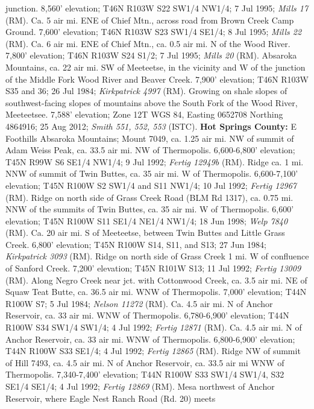 junction. 8,560’ elevation; T46N R103W S22 SW1/4 NW1/4; 7 Jul 1995;
\textit{Mills 17} (RM).
Ca. 5 air mi. ENE of Chief Mtn., across road from Brown Creek Camp Ground.
7,600’ elevation; T46N R103W S23 SW1/4 SE1/4; 8 Jul 1995;
\textit{Mills 22} (RM).
Ca. 6 air mi. ENE of Chief Mtn., ca. 0.5 air mi. N of the Wood River. 7,800’
elevation; T46N R103W S24 S1/2; 7 Jul 1995; \textit{Mills 20} (RM).
Absaroka Mountains, ca. 22 air mi. SW of Meeteetse, in the vicinity and W of the
junction of the Middle Fork Wood River and Beaver Creek. 7,900’ elevation;
T46N R103W S35 and 36; 26 Jul 1984; \textit{Kirkpatrick 4997} (RM).
Growing on shale slopes of southwest-facing slopes of mountains above the South
Fork of the Wood River, Meeteetsee. 7,588’ elevation; Zone 12T WGS 84,
Easting 0652708 Northing 4864916; 25 Aug 2012;
\textit{Smith 551, 552, 553} (ISTC).
  \textbf{Hot Springs County:}
E Foothills Absaroka Mountains; Mount 7049, ca. 1.25 air mi. NW of summit of
Adam Weiss Peak, ca. 33.5 air mi. NW of Thermopolis. 6,600-6,800' elevation;
T45N R99W S6 SE1/4 NW1/4; 9 Jul 1992; \textit{Fertig 12949b} (RM).
Ridge ca. 1 mi. NNW of summit of Twin Buttes, ca. 35 air mi. W of Thermopolis.
6,600-7,100' elevation; T45N R100W S2 SW1/4 and S11 NW1/4; 10 Jul 1992;
\textit{Fertig 12967} (RM).
Ridge on north side of Grass Creek Road (BLM Rd 1317), ca. 0.75 mi. NNW of the
summits of Twin Buttes, ca. 35 air mi. W of Thermopolis. 6,600' elevation;
T45N R100W S11 SE1/4 NE1/4 NW1/4; 18 Jun 1998; \textit{Welp 7840} (RM).
Ca. 20 air mi. S of Meeteetse, between Twin Buttes and Little Grass Creek.
6,800' elevation; T45N R100W S14, S11, and S13; 27 Jun 1984;
\textit{Kirkpatrick 3093} (RM).
Ridge on north side of Grass Creek 1 mi. W of confluence of Sanford Creek.
7,200' elevation; T45N R101W S13; 11 Jul 1992; \textit{Fertig 13009} (RM).
Along Negro Creek near jct. with Cottonwood Creek, ca. 3.5 air mi. NE of Squaw
Teat Butte, ca. 36.5 air mi. WNW of Thermopolis. 7,000' elevation;
T44N R100W S7; 5 Jul 1984; \textit{Nelson 11272} (RM).
Ca. 4.5 air mi. N of Anchor Reservoir, ca. 33 air mi. WNW of Thermopolis.
6,780-6,900' elevation; T44N R100W S34 SW1/4 SW1/4; 4 Jul 1992;
\textit{Fertig 12871} (RM).
Ca. 4.5 air mi. N of Anchor Reservoir, ca. 33 air mi. WNW of Thermopolis.
6,800-6,900' elevation; T44N R100W S33 SE1/4; 4 Jul 1992;
\textit{Fertig 12865} (RM).
Ridge NW of summit of Hill 7493, ca. 4.5 air mi. N of Anchor Reservoir, ca.
33.5 air mi WNW of Thermopolis. 7,340-7,400' elevation; T44N R100W S33 SW1/4
SW1/4, S32 SE1/4 SE1/4; 4 Jul 1992; \textit{Fertig 12869} (RM).
Mesa northwest of Anchor Reservoir, where Eagle Nest Ranch Road (Rd. 20) meets
